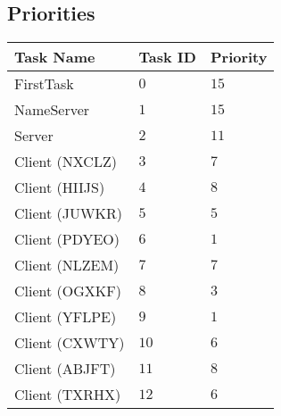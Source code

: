 \documentclass[12pt]{article}
\begin{document}
\subsection{Priorities}
\begin{center}
  \begin{tabular}{|l|l|l|}
    \hline
    {\bf Task Name} & {\bf Task ID} & {\bf Priority} \\\hline
    FirstTask       & $0$  & $15$ \\\hline
    NameServer      & $1$  & $15$ \\\hline
    Server          & $2$  & $11$ \\\hline
    Client (NXCLZ)  & $3$  & $7$ \\\hline
    Client (HIIJS)  & $4$  & $8$ \\\hline
    Client (JUWKR)  & $5$  & $5$ \\\hline
    Client (PDYEO)  & $6$  & $1$ \\\hline
    Client (NLZEM)  & $7$  & $7$ \\\hline
    Client (OGXKF)  & $8$  & $3$ \\\hline
    Client (YFLPE)  & $9$  & $1$ \\\hline
    Client (CXWTY)  & $10$ & $6$ \\\hline
    Client (ABJFT)  & $11$ & $8$ \\\hline
    Client (TXRHX)  & $12$ & $6$ \\\hline
  \end{tabular}
  \\
\end{center}
\end{document}
